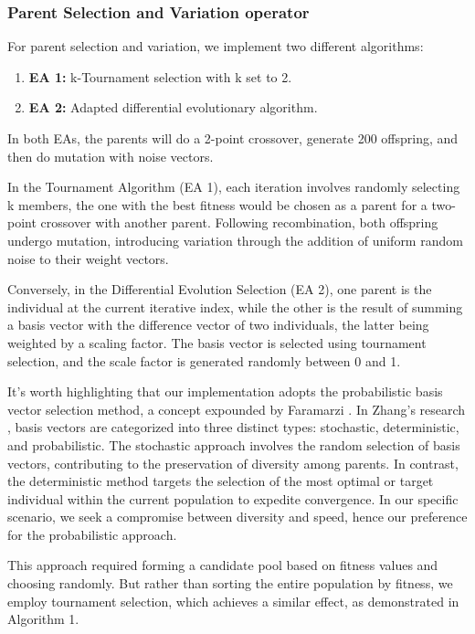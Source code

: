 \subsubsection{Parent Selection and Variation operator}
\label{sec:psel}
For parent selection and variation, we implement two different algorithms:
\begin{enumerate}
    \item \textbf{EA 1:} k-Tournament selection with k set to 2.
    \item \textbf{EA 2:} Adapted differential evolutionary algorithm.
\end{enumerate}
In both EAs, the parents will do a 2-point crossover, generate 200 offspring, and then do mutation with noise vectors.

In the Tournament Algorithm (EA 1), each iteration involves randomly selecting k members, the one with the best fitness would be chosen as a parent for a two-point crossover with another parent. Following recombination, both offspring undergo mutation, introducing variation through the addition of uniform random noise to their weight vectors.

Conversely, in the Differential Evolution Selection (EA 2), one parent is the individual at the current iterative index, while the other is the result of summing a basis vector with the difference vector of two individuals, the latter being weighted by a scaling factor. The basis vector is selected using tournament selection, and the scale factor is generated randomly between 0 and 1.

It's worth highlighting that our implementation adopts the probabilistic basis vector selection method, a concept expounded by Faramarzi \cite{FARAMARZI2020105190}. In Zhang's research \cite{ZHONG2023110470}, basis vectors are categorized into three distinct types: stochastic, deterministic, and probabilistic. The stochastic approach involves the random selection of basis vectors, contributing to the preservation of diversity among parents. In contrast, the deterministic method targets the selection of the most optimal or target individual within the current population to expedite convergence. In our specific scenario, we seek a compromise between diversity and speed, hence our preference for the probabilistic approach.

This approach required forming a candidate pool based on fitness values and choosing randomly. But rather than sorting the entire population by fitness, we employ tournament selection, which achieves a similar effect, as demonstrated in Algorithm 1.

